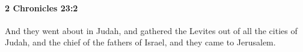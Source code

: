 
		\paragraph{2 Chronicles 23:2} %
			\label{2CHRONICLES-23-2}

			And they went about in Judah, and gathered the Levites out of all the cities of Judah, and the chief of the fathers of Israel, and they came to Jerusalem.


